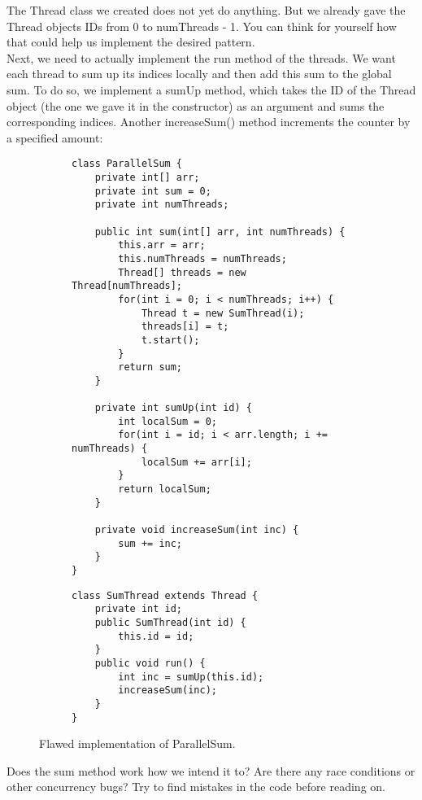 \documentclass[main.tex]{subfiles}
\begin{document}
The Thread class we created does not yet do anything. But we already gave the Thread objects IDs from 0 to numThreads - 1. You can think for yourself how that could help us implement the desired pattern.\\[3mm]
Next, we need to actually implement the run method of the threads. We want each thread to sum up its indices locally and then add this sum to the global sum. To do so, we implement a sumUp method, which takes the ID of the Thread object (the one we gave it in the constructor) as an argument and sums the corresponding indices. Another increaseSum() method increments the counter by a specified amount:

\begin{figure}[H]
    \begin{subfigure}[t]{.62\textwidth}
        \begin{verbatim}
class ParallelSum {
    private int[] arr;
    private int sum = 0;
    private int numThreads;

    public int sum(int[] arr, int numThreads) {
        this.arr = arr;
        this.numThreads = numThreads;
        Thread[] threads = new Thread[numThreads];
        for(int i = 0; i < numThreads; i++) {
            Thread t = new SumThread(i);
            threads[i] = t;
            t.start();
        }
        return sum;
    }

    private int sumUp(int id) {
        int localSum = 0;
        for(int i = id; i < arr.length; i += numThreads) {
            localSum += arr[i];
        }
        return localSum;
    }

    private void increaseSum(int inc) {
        sum += inc;
    }
}
        \end{verbatim}
    \end{subfigure}%
    \begin{subfigure}[t]{.62\textwidth}
        \begin{verbatim}
class SumThread extends Thread {
    private int id;
    public SumThread(int id) {
        this.id = id;
    }
    public void run() {
        int inc = sumUp(this.id);
        increaseSum(inc);
    }
}
        \end{verbatim}
    \end{subfigure}
    \caption{Flawed implementation of ParallelSum.}
\end{figure}
Does the sum method work how we intend it to? Are there any race conditions or other concurrency bugs? Try to find mistakes in the code before reading on.\\[3mm]
\end{document}
